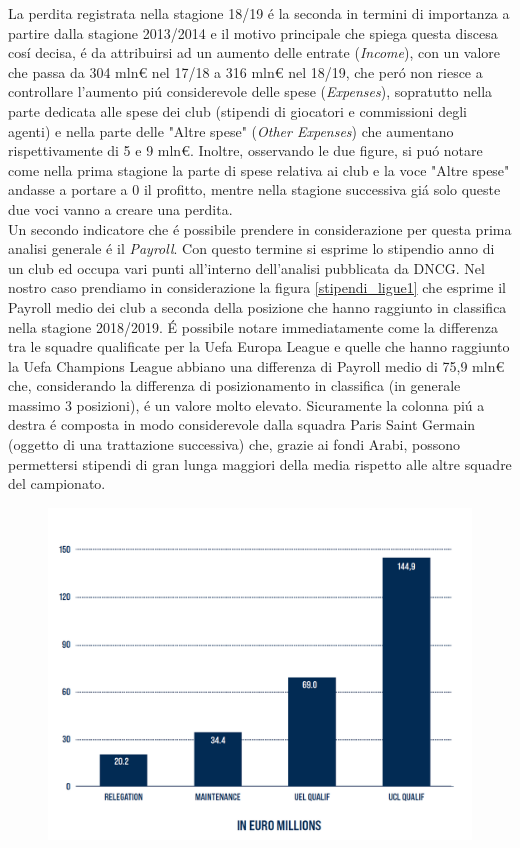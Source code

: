 \documentclass[
    corpo=11.5pt,
    oneside,
    evenboxes,
    tipotesi=triennale,
    stile=classica,
    oldstyle,
    autoretitolo,
    greek,
]{toptesi}
\begin{document}
\begin{interlinea}{1.5}
La perdita registrata nella stagione 18/19 \'e la seconda in termini di importanza a partire dalla stagione 2013/2014 e
il motivo principale che spiega questa discesa cos\'i decisa, \'e da attribuirsi ad un aumento delle entrate (\emph{Income}),
con un valore che passa da 304 mln€ nel 17/18 a 316 mln€ nel 18/19, che per\'o non riesce a controllare l'aumento pi\'u considerevole
delle spese (\emph{Expenses}), sopratutto nella parte dedicata alle spese dei club (stipendi di giocatori e commissioni degli agenti) 
e nella parte delle "Altre spese" (\emph{Other Expenses}) che aumentano rispettivamente di 5 e 9 mln€. Inoltre, osservando le due figure,
si pu\'o notare come nella prima stagione la parte di spese relativa ai club e la voce "Altre spese" andasse a portare a 0 il profitto,
mentre nella stagione successiva gi\'a solo queste due voci vanno a creare una perdita.\\
Un secondo indicatore che \'e possibile prendere in considerazione per questa prima analisi generale \'e il \emph{Payroll}. Con questo termine
si esprime lo stipendio anno di un club ed occupa vari punti all'interno dell'analisi pubblicata da DNCG. Nel nostro caso prendiamo 
in considerazione la figura \ref{stipendi_ligue1} che esprime il Payroll medio dei club a seconda della posizione che hanno raggiunto
in classifica nella stagione 2018/2019. \'E possibile notare immediatamente come la differenza tra le squadre qualificate per 
la Uefa Europa League e quelle che hanno raggiunto la Uefa Champions League abbiano una differenza di Payroll medio di 75,9 mln€ 
che, considerando la differenza di posizionamento in classifica (in generale massimo 3 posizioni), \'e un valore molto elevato. 
Sicuramente la colonna pi\'u a destra \'e composta in modo considerevole dalla squadra Paris Saint Germain 
(oggetto di una trattazione successiva) che, grazie ai fondi Arabi, possono permettersi
stipendi di gran lunga maggiori della media rispetto alle altre squadre del campionato.
\begin{figure}
    \centering
    \includegraphics[scale=.5]{img/stipendi_ligue1.png}

\end{figure}
\end{interlinea}
\end{document}
